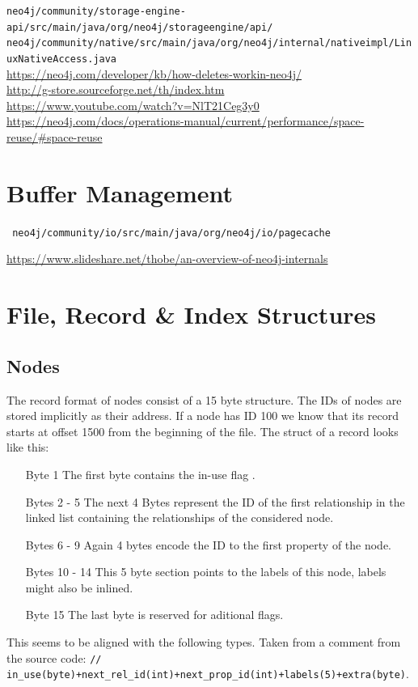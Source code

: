 \documentclass[a4paper,10pt]{article}
\begin{document}
\texttt{neo4j/community/storage-engine-api/src/main/java/org/neo4j/storageengine/api/} \\

\texttt{neo4j/community/native/src/main/java/org/neo4j/internal/nativeimpl/LinuxNativeAccess.java} \\

\href{Hpw delete works}{https://neo4j.com/developer/kb/how-deletes-workin-neo4j/} \\

\href{G-Store}{http://g-store.sourceforge.net/th/index.htm} \\

\href{Algorithms \& data structures}{https://www.youtube.com/watch?v=NlT21Ceg3y0}  \\

\href{Reusing space}{https://neo4j.com/docs/operations-manual/current/performance/space-reuse/\#space-reuse} \\


\section{Buffer Management}
\texttt{
neo4j/community/io/src/main/java/org/neo4j/io/pagecache
}

\href{Page Cache layout ??? Outdated ???}{https://www.slideshare.net/thobe/an-overview-of-neo4j-internals} \\


\section{File, Record \& Index Structures}
    \subsection{Nodes}
    The record format of nodes consist of a 15 byte structure. The IDs of nodes are stored implicitly as their address. If a node has ID 100 we know that its record starts at offset 1500 from the beginning of the file. The struct of a record looks like this:
    \begin{enumerate}
     \item[Byte 1] The first byte contains the in-use flag .
     \item[Bytes 2 - 5] The next 4 Bytes represent the ID of the first relationship in the linked list containing the relationships of the considered node.
     \item[Bytes 6 - 9] Again 4 bytes encode the ID to the first property of the node.
     \item[Bytes 10 - 14] This 5 byte section points to the labels of this node, labels might also be inlined.
     \item[Byte 15] The last byte is reserved for aditional flags.
    \end{enumerate}
    This seems to be aligned with the following types. Taken from a comment from the source code:
    \texttt{// in_use(byte)+next_rel_id(int)+next_prop_id(int)+labels(5)+extra(byte)}. \\
    
\end{document}
